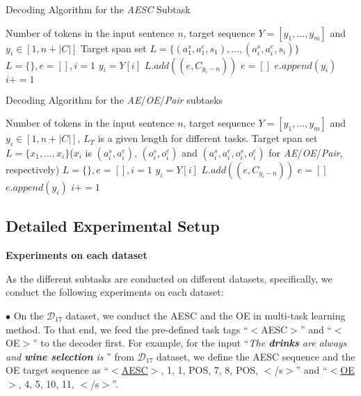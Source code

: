 \documentclass[11pt,a4paper]{article}
\begin{document}
\begin{algorithm}[!h]
  \begin{algorithmic}[1]
    \caption{Decoding Algorithm for the \emph{AESC} Subtask} \label{al2}
    \Require Number of tokens in the input sentence $n$, target sequence $Y=[y_1, ..., y_m]$ and $y_i \in [1, n+|C|]$
    \Ensure  Target span set $L=\{(a_1^s, a_1^e, s_1), ..., (a_i^s, a_i^e, s_i)\}$
    \State $L=\{\}, e=[], i=1$ 
      \State $y_i = Y[i]$
      \State  $L.add((e, C_{y_i-n}))$
      \State $e=[]$
      \Else
      \State $e.append(y_i)$
      \EndIf
      \State $i+=1$
    \EndWhile
    \State {}
  \end{algorithmic}  
\end{algorithm}

\begin{algorithm}[!h]
    \begin{algorithmic}[1]
      \caption{Decoding Algorithm for the \emph{AE}/\emph{OE}/\emph{Pair} subtasks} \label{al3}
      \Require Number of tokens in the input sentence $n$, target sequence $Y=[y_1, ..., y_m]$ and $y_i \in [1, n+|C|]$, $L_T$ is a given length for different tasks.
      \Ensure  Target span set $L=\{x_1, ..., x_i\}$($x_i$ is $(a_i^s, a_i^e)$, $(o_i^s, o_i^e)$ and $(a_i^s, a_i^e, o_i^s, o_i^e)$ for \emph{AE}/\emph{OE}/\emph{Pair}, respectively)
      \State $L=\{\}, e=[], i=1$ 
        \State $y_i = Y[i]$
        \State  $L.add((e, C_{y_i-n}))$
        \State $e=[]$
        \EndIf
        \State $e.append(y_i)$
        \State $i+=1$
      \EndWhile
      \State {}
    \end{algorithmic}  
\end{algorithm}




\subsection{Detailed Experimental Setup}
\textbf{Experiments on each dataset}

As the different subtasks are conducted on different datasets, specifically, we conduct the following experiments on each dataset:

$\bullet$  On the \emph{$\mathcal{D}_{17}$} dataset, we conduct the AESC and the OE  in multi-task learning method. To that end, we feed the pre-defined task tags ``$<$AESC$>$'' and ``$<$OE$>$'' to the decoder first. For example, for the input ``\emph{The \textbf{drinks} are always  and \textbf{wine selection} is }'' from \emph{$\mathcal{D}_{17}$} dataset, we define the AESC sequence and the OE target sequence as  ``$<$\underline{AESC}$>$, 1, 1, POS, 7, 8, POS, $<$/s$>$'' and ``$<$\underline{OE}$>$, 4, 5, 10, 11, $<$/s$>$''.
\end{document}
